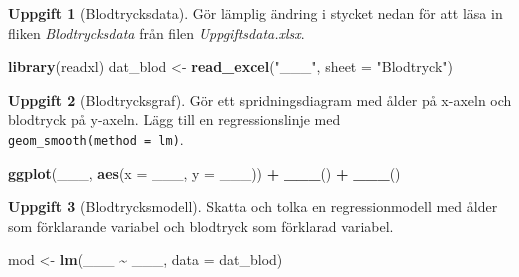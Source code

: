 \documentclass[
]{book}
\newenvironment{Shaded}{\begin{snugshade}}{\end{snugshade}}
\newcommand{\AttributeTok}[1]{\textcolor[rgb]{0.13,0.29,0.53}{#1}}
\newcommand{\FunctionTok}[1]{\textcolor[rgb]{0.13,0.29,0.53}{\textbf{#1}}}
\newcommand{\NormalTok}[1]{#1}
\newcommand{\OtherTok}[1]{\textcolor[rgb]{0.56,0.35,0.01}{#1}}
\newcommand{\SpecialCharTok}[1]{\textcolor[rgb]{0.81,0.36,0.00}{\textbf{#1}}}
\newcommand{\StringTok}[1]{\textcolor[rgb]{0.31,0.60,0.02}{#1}}
\theoremstyle{definition}
\theoremstyle{definition}
\theoremstyle{definition}
\newtheorem{exercise}{Uppgift}[chapter]
\theoremstyle{definition}
\theoremstyle{remark}
\begin{document}
\begin{exercise}[Blodtrycksdata]

Gör lämplig ändring i stycket nedan för att läsa in fliken \emph{Blodtrycksdata} från filen \emph{Uppgiftsdata.xlsx}.

\begin{Shaded}
\begin{Highlighting}[]
\FunctionTok{library}\NormalTok{(readxl)}
\NormalTok{dat\_blod }\OtherTok{\textless{}{-}} \FunctionTok{read\_excel}\NormalTok{(}\StringTok{"\_\_\_"}\NormalTok{, }\AttributeTok{sheet =} \StringTok{"Blodtryck"}\NormalTok{)}
\end{Highlighting}
\end{Shaded}

\end{exercise}

\begin{exercise}[Blodtrycksgraf]

Gör ett spridningsdiagram med ålder på x-axeln och blodtryck på y-axeln. Lägg till en regressionslinje med \texttt{geom\_smooth(method\ =\ lm)}.

\begin{Shaded}
\begin{Highlighting}[]
\FunctionTok{ggplot}\NormalTok{(\_\_\_, }\FunctionTok{aes}\NormalTok{(}\AttributeTok{x =}\NormalTok{ \_\_\_, }\AttributeTok{y =}\NormalTok{ \_\_\_)) }\SpecialCharTok{+}
  \FunctionTok{\_\_\_}\NormalTok{() }\SpecialCharTok{+}
  \FunctionTok{\_\_\_}\NormalTok{()}
\end{Highlighting}
\end{Shaded}

\end{exercise}

\begin{exercise}[Blodtrycksmodell]

Skatta och tolka en regressionmodell med ålder som förklarande variabel och blodtryck som förklarad variabel.

\begin{Shaded}
\begin{Highlighting}[]
\NormalTok{mod }\OtherTok{\textless{}{-}} \FunctionTok{lm}\NormalTok{(\_\_\_ }\SpecialCharTok{\textasciitilde{}}\NormalTok{ \_\_\_, }\AttributeTok{data =}\NormalTok{ dat\_blod)}
\end{Highlighting}
\end{Shaded}

\end{exercise}
\end{document}
